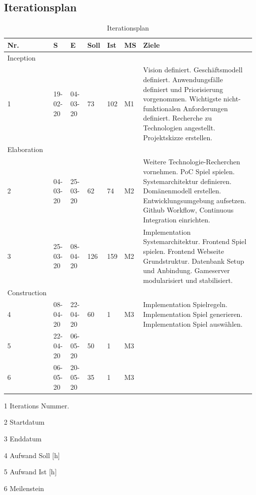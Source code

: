 \documentclass[11pt,ngerman]{article}
\begin{document}
\subsection{Iterationsplan}
\begin{table}[H]
	\caption{Iterationsplan}
    \begin{threeparttable}
	   \begin{tabularx}{\textwidth}{l l l l l l X}

	   	\toprule
	   	Nr.\tnote{1} & S\tnote{2} & E\tnote{3} &  Soll\tnote{4}  & Ist\tnote{5} & MS\tnote{6} & Ziele \\
	   	\toprule
	   	Inception &&&& \\

	   	1 & 19-02-20 & 04-03-20 & 73 & 102 & M1 & Vision definiert. Geschäftsmodell definiert. Anwendungsfälle definiert und Priorisierung vorgenommen. Wichtigste nicht-funktionalen Anforderungen definiert. Recherche zu Technologien angestellt. Projektskizze erstellen. \\

	   	\toprule
	   	Elaboration &&&& \\

	   	2 & 04-03-20 & 25-03-20 & 62 & 74 & M2 & Weitere Technologie-Recherchen vornehmen. PoC Spiel spielen. Systemarchitektur definieren. Domänenmodell erstellen. Entwicklungsumgebung aufsetzen. Github Workflow, Continuous Integration einrichten. \\

	   	3 & 25-03-20 & 08-04-20 & 126 & 159 & M2 & Implementation Systemarchitektur. Frontend Spiel spielen. Frontend Webseite Grundstruktur. Datenbank Setup und Anbindung. Gameserver modularisiert und stabilisiert. \\

	   	\toprule
	   	Construction &&&&\\

	   	4 & 08-04-20 & 22-04-20 & 60 & 1 & M3 & Implementation Spielregeln. Implementation Spiel generieren. Implementation Spiel auswählen. \\

	   	5 & 22-04-20 & 06-05-20 & 50 & 1 & M3 & \\

	   	6 & 06-05-20 & 20-05-20 & 35 & 1 & M3 & \\
	   	\toprule

	   \end{tabularx}
    \begin{tablenotes}
        \item[1] Iterations Nummer.
        \item[2] Startdatum
        \item[3] Enddatum
        \item[4] Aufwand Soll [h]
        \item[5] Aufwand Ist [h]
        \item[6] Meilenstein
    \end{tablenotes}
   \end{threeparttable}


	\label{tab:Iterationsplan}
\end{table}
\end{document}
